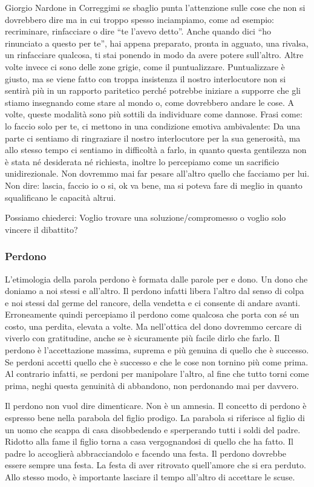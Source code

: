 \documentclass[12pt]{book} %
\begin{document}
Giorgio Nardone in Correggimi se sbaglio punta
l'attenzione sulle cose che non si dovrebbero dire ma in cui troppo spesso inciampiamo, come ad
esempio: recriminare, rinfacciare o dire “te l'avevo detto”. Anche quando dici “ho rinunciato a questo per te”, hai
appena preparato, pronta in agguato, una rivalsa, un rinfacciare qualcosa, ti stai ponendo in modo da avere potere
sull'altro. Altre volte invece ci sono delle zone grigie, come il puntualizzare. Puntualizzare è giusto, ma se viene
fatto con troppa insistenza il nostro interlocutore non si sentirà più in un rapporto paritetico perché potrebbe
iniziare a supporre che gli stiamo insegnando come stare al mondo o, come dovrebbero andare le cose. A volte, queste
modalità sono più sottili da individuare come dannose. Frasi come: lo faccio solo per te, ci mettono in una condizione
emotiva ambivalente: Da una parte ci sentiamo di ringraziare il nostro interlocutore per la sua generosità, ma allo
stesso tempo ci sentiamo in difficoltà a farlo, in quanto questa gentilezza non è stata né desiderata né
richiesta, inoltre lo percepiamo come un sacrificio unidirezionale. Non dovremmo mai far pesare
all'altro quello che facciamo per lui. Non dire: lascia, faccio io o si, ok va bene, ma si poteva
fare di meglio in quanto squalificano le capacità altrui.

Possiamo chiederci: Voglio trovare una soluzione/compromesso o voglio solo vincere il dibattito? 

\subsubsection{Perdono}
L'etimologia della parola perdono è formata dalle parole per e dono. Un dono che doniamo a noi
stessi e all'altro. Il perdono infatti libera l'altro dal senso di colpa e
noi stessi dal germe del rancore, della vendetta e ci consente di andare avanti. Erroneamente quindi percepiamo il
perdono come qualcosa che porta con sé un costo, una perdita, elevata a volte. Ma nell'ottica del
dono dovremmo cercare di viverlo con gratitudine, anche se è sicuramente più facile dirlo che farlo. Il perdono è
l'accettazione massima, suprema e più genuina di quello che è successo. Se perdoni accetti quello
che è successo e che le cose non tornino più come prima. Al contrario infatti, se perdoni per manipolare l'altro, al
fine che tutto torni come prima, neghi questa genuinità di abbandono, non perdonando mai per davvero.

Il perdono non vuol dire dimenticare. Non è un amnesia. Il concetto di perdono è espresso bene nella parabola del figlio
prodigo. La parabola si riferisce al figlio di un uomo che scappa di casa
disobbedendo e sperperando tutti i soldi del padre. Ridotto alla fame il figlio torna a casa vergognandosi di quello
che ha fatto. Il padre lo accoglierà abbracciandolo e facendo una festa. Il perdono dovrebbe essere sempre una festa.
La festa di aver ritrovato quell'amore che si era perduto. Allo stesso modo, è importante lasciare il tempo
all'altro di accettare le scuse.
\end{document}
